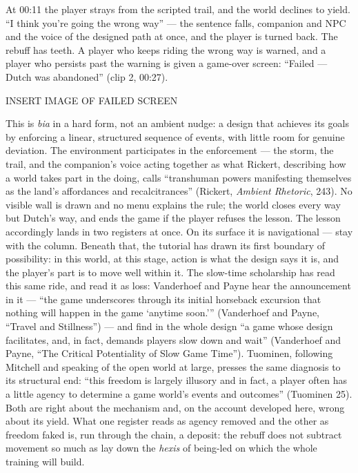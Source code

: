 At 00:11 the player strays from the scripted trail, and the world declines to yield. ``I think you're going the wrong way'' — the sentence falls, companion and NPC and the voice of the designed path at once, and the player is turned back. The rebuff has teeth. A player who keeps riding the wrong way is warned, and a player who persists past the warning is given a game-over screen: ``Failed --- Dutch was abandoned'' (clip 2, 00:27).

INSERT IMAGE OF FAILED SCREEN

This is \textit{bia} in a hard form, not an ambient nudge: a design that achieves its goals by enforcing a linear, structured sequence of events, with little room for genuine deviation. The environment participates in the enforcement — the storm, the trail, and the companion's voice acting together as what Rickert, describing how a world takes part in the doing, calls ``transhuman powers manifesting themselves as the land's affordances and recalcitrances'' (Rickert, \textit{Ambient Rhetoric}, 243). No visible wall is drawn and no menu explains the rule; the world closes every way but Dutch's way, and ends the game if the player refuses the lesson. The lesson accordingly lands in two registers at once. On its surface it is navigational — stay with the column. Beneath that, the tutorial has drawn its first boundary of possibility: in this world, at this stage, action is what the design says it is, and the player's part is to move well within it.
The slow-time scholarship has read this same ride, and read it as loss: Vanderhoef and Payne hear the announcement in it — ``the game underscores through its initial horseback excursion that nothing will happen in the game `anytime soon.'{}'' (Vanderhoef and Payne, ``Travel and Stillness'') — and find in the whole design ``a game whose design facilitates, and, in fact, demands players slow down and wait'' (Vanderhoef and Payne, ``The Critical Potentiality of Slow Game Time''). Tuominen, following Mitchell and speaking of the open world at large, presses the same diagnosis to its structural end: ``this freedom is largely illusory and in fact, a player often has a little agency to determine a game world's events and outcomes'' (Tuominen 25). Both are right about the mechanism and, on the account developed here, wrong about its yield. What one register reads as agency removed and the other as freedom faked is, run through the chain, a deposit: the rebuff does not subtract movement so much as lay down the \textit{hexis} of being-led on which the whole training will build.

